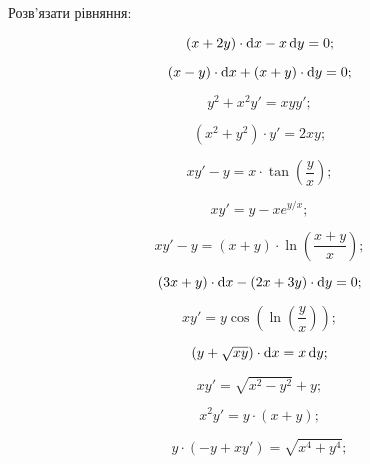 Розв'язати рівняння:
\begin{multicols}{2}
	\begin{problem}
		\[ (x + 2y) \cdot \mathop{}\!\mathrm{d} x - x \mathop{}\!\mathrm{d} y = 0; \]
	\end{problem}

	\begin{problem}
		\[ (x - y) \cdot \mathop{}\!\mathrm{d} x + (x + y) \cdot \mathop{}\!\mathrm{d} y = 0; \]
	\end{problem}
	
	\begin{problem}
		\[y^2 + x^2 y' = x y y'; \]
	\end{problem}
	
	\begin{problem}
		\[ (x^2 + y^2) \cdot y' = 2 xy; \]
	\end{problem}
	
	\begin{problem}
		\[ xy' - y = x \cdot \tan \left( \frac{y}{x} \right); \]
	\end{problem}
	
	\begin{problem}
		\[ x y' = y - x e^{y / x}; \]
	\end{problem}
	
	\begin{problem}
		\[x y' - y = (x + y) \cdot \ln \left( \frac{x + y}{x} \right); \]
	\end{problem}
	
	\begin{problem}
		\[ (3x + y) \cdot \mathop{}\!\mathrm{d} x - (2x + 3y) \cdot \mathop{}\!\mathrm{d} y = 0; \]
	\end{problem}
	
	\begin{problem}
		\[ x y' = y \cos \left(\ln \left(\frac{y}{x} \right)\right); \]
	\end{problem}
	
	\begin{problem}
		\[ \left(y+\sqrt{xy}\right)\cdot \mathop{}\!\mathrm{d} x = x \mathop{}\!\mathrm{d} y; \]
	\end{problem}
	
	\begin{problem}
		\[ xy' = \sqrt{x^2 - y^2} + y; \]
	\end{problem}
	
	\begin{problem}
		\[ x^2 y' = y \cdot (x + y); \]
	\end{problem}
	
	\begin{problem}
		\[ y \cdot (-y + xy') = \sqrt{x^4 + y^4}; \]
	\end{problem}
	

\end{multicols}
